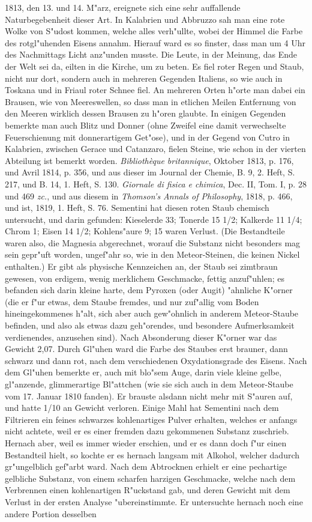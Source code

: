 \documentclass[a4paper, 11pt, oneside, polutonikogreek, german]{article}
\begin{document}
1813, den 13. und 14. M"arz, ereignete sich eine sehr auffallende Naturbegebenheit dieser Art. In Kalabrien und Abbruzzo sah man eine rote Wolke von S"udost kommen, welche alles verh"ullte, wobei der Himmel die Farbe des rotgl"uhenden Eisens annahm. Hierauf ward es so finster, dass man um 4 Uhr des Nachmittags Licht anz"unden musste. Die Leute, in der Meinung, das Ende der Welt sei da, eilten in die Kirche, um zu beten. Es fiel roter Regen und Staub, nicht nur dort, sondern auch in mehreren Gegenden Italiens, so wie auch in Toskana und in Friaul roter Schnee fiel. An mehreren Orten h"orte man dabei ein Brausen, wie von Meereswellen, so dass man in etlichen Meilen Entfernung von den Meeren wirklich dessen Brausen zu h"oren glaubte. In einigen Gegenden bemerkte man auch Blitz und Donner (ohne Zweifel eine damit verwechselte Feuerschienung mit donnerartigem Get"ose), und in der Gegend von Cutro in Kalabrien, zwischen Gerace und Catanzaro, fielen Steine, wie schon in der vierten Abteilung ist bemerkt worden. \emph{Bibliothèque britannique}, Oktober 1813, p. 176, und Avril 1814, p. 356, und aus dieser im Journal der Chemie, B. 9, 2. Heft, S. 217, und B. 14, 1. Heft, S. 130. \emph{Giornale di fisica e chimica}, Dec. II, Tom. I, p. 28 und 469 \emph{zc.}, und aus diesem in \emph{Thomson's Annals of Philosophy}, 1818, p. 466, und ist, 1819, 1. Heft, S. 76. Sementini hat diesen roten Staub chemisch untersucht, und darin gefunden: Kieselerde 33; Tonerde 15 1/2; Kalkerde 11 1/4; Chrom 1; Eisen 14 1/2; Kohlens"aure 9; 15 waren Verlust. (Die Bestandteile waren also, die Magnesia abgerechnet, worauf die Substanz nicht besonders mag sein gepr"uft worden, ungef"ahr so, wie in den Meteor-Steinen, die keinen Nickel enthalten.) Er gibt als physische Kennzeichen an, der Staub sei zimtbraun gewesen, von erdigem, wenig merklichem Geschmacke, fettig anzuf"uhlen; es befanden sich darin kleine harte, dem Pyroxen (oder Augit) "ahnliche K"orner (die er f"ur etwas, dem Staube fremdes, und nur zuf"allig vom Boden hineingekommenes h"alt, sich aber auch gew"ohnlich in anderem Meteor-Staube befinden, und also als etwas dazu geh"orendes, und besondere Aufmerksamkeit verdienendes, anzusehen sind). Nach Absonderung dieser K"orner war das Gewicht 2,07. Durch Gl"uhen ward die Farbe des Staubes erst brauner, dann schwarz und dann rot, nach dem verschiedenen Oxydationsgrade des Eisens. Nach dem Gl"uhen bemerkte er, auch mit blo"sem Auge, darin viele kleine gelbe, gl"anzende, glimmerartige Bl"attchen (wie sie sich auch in dem Meteor-Staube vom 17. Januar 1810 fanden). Er brauste alsdann nicht mehr mit S"auren auf, und hatte 1/10 an Gewicht verloren. Einige Mahl hat Sementini nach dem Filtrieren ein feines schwarzes kohlenartiges Pulver erhalten, welches er anfangs nicht achtete, weil er es einer fremden dazu gekommenen Substanz zuschrieb. Hernach aber, weil es immer wieder erschien, und er es dann doch f"ur einen Bestandteil hielt, so kochte er es hernach langsam mit Alkohol, welcher dadurch gr"ungelblich gef"arbt ward. Nach dem Abtrocknen erhielt er eine pechartige gelbliche Substanz, von einem scharfen harzigen Geschmacke, welche nach dem Verbrennen einen kohlenartigen R"uckstand gab, und deren Gewicht mit dem Verlust in der ersten Analyse "ubereinstimmte. Er untersuchte hernach noch eine andere Portion desselben 
\end{document}
